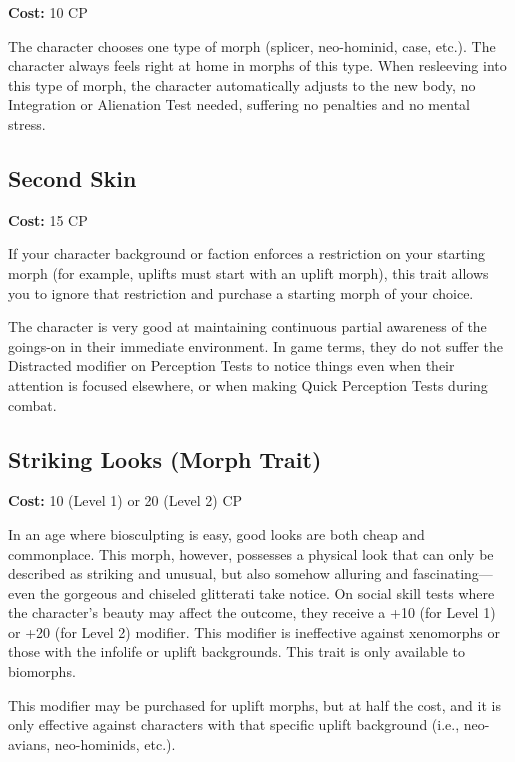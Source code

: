 \textbf{Cost:} 10 CP 

The character chooses one type of morph (splicer, neo-hominid, case, etc.). The character always feels right at home in morphs of this type. When resleeving into this type of morph, the character automatically adjusts to the new body, no Integration or Alienation Test needed, suffering no penalties and no mental stress. 

\subsection{Second Skin} \label{sec:traits-secondskin} 

\textbf{Cost:} 15 CP 

If your character background or faction enforces a restriction on your starting morph (for example, uplifts must start with an uplift morph), this trait allows you to ignore that restriction and purchase a starting morph of your choice. 





The character is very good at maintaining continuous partial awareness of the goings-on in their immediate environment. In game terms, they do not suffer the Distracted modifier on Perception Tests to notice things even when their attention is focused elsewhere, or when making Quick Perception Tests during combat. 

\subsection{Striking Looks (Morph Trait)} \label{sec:traits-striking-looks} 

\textbf{Cost:} 10 (Level 1) or 20 (Level 2) CP 

In an age where biosculpting is easy, good looks are both cheap and commonplace. This morph, however, possesses a physical look that can only be described as striking and unusual, but also somehow alluring and fascinating—even the gorgeous and chiseled glitterati take notice. On social skill tests where the character’s beauty may affect the outcome, they receive a +10 (for Level 1) or +20 (for Level 2) modifier. This modifier is ineffective against xenomorphs or those with the infolife or uplift backgrounds. This trait is only available to biomorphs. 

This modifier may be purchased for uplift morphs, but at half the cost, and it is only effective against characters with that specific uplift background (i.e., neo-avians, neo-hominids, etc.). 

